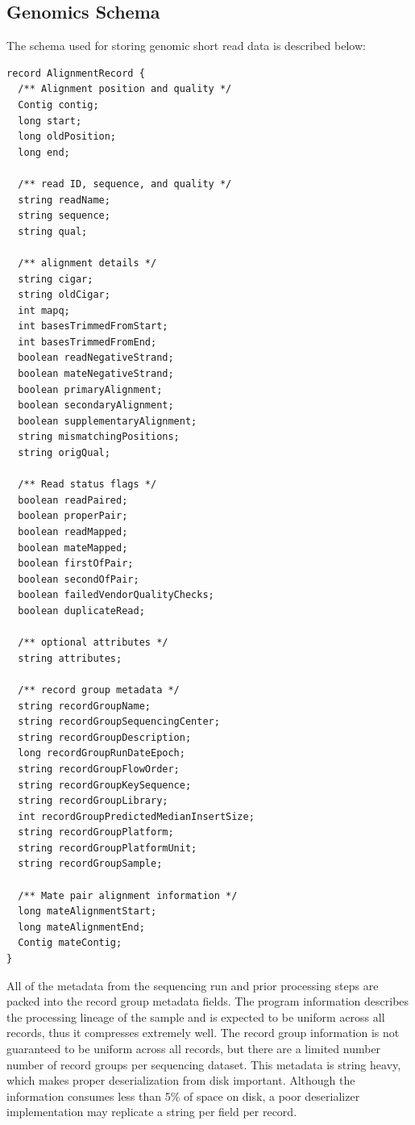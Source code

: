 \documentclass{sig-alternate}
\begin{document}
\subsection{Genomics Schema}
\label{sec:genomics-schema}

The schema used for storing genomic short read data is described below:

\begin{lstlisting}
record AlignmentRecord {
  /** Alignment position and quality */
  Contig contig;
  long start;
  long oldPosition;
  long end;

  /** read ID, sequence, and quality */
  string readName;
  string sequence;
  string qual;
  
  /** alignment details */
  string cigar;
  string oldCigar;
  int mapq;
  int basesTrimmedFromStart;
  int basesTrimmedFromEnd;
  boolean readNegativeStrand;
  boolean mateNegativeStrand;
  boolean primaryAlignment;
  boolean secondaryAlignment;
  boolean supplementaryAlignment;
  string mismatchingPositions;
  string origQual;

  /** Read status flags */
  boolean readPaired;
  boolean properPair;
  boolean readMapped;
  boolean mateMapped;
  boolean firstOfPair;
  boolean secondOfPair;
  boolean failedVendorQualityChecks;
  boolean duplicateRead;

  /** optional attributes */
  string attributes;

  /** record group metadata */
  string recordGroupName;
  string recordGroupSequencingCenter;
  string recordGroupDescription;
  long recordGroupRunDateEpoch;
  string recordGroupFlowOrder;
  string recordGroupKeySequence;
  string recordGroupLibrary;
  int recordGroupPredictedMedianInsertSize;
  string recordGroupPlatform;
  string recordGroupPlatformUnit;
  string recordGroupSample;

  /** Mate pair alignment information */
  long mateAlignmentStart;
  long mateAlignmentEnd;
  Contig mateContig;
}
\end{lstlisting}

All of the metadata from the sequencing run and prior processing steps are packed into the record
group metadata fields. The program information describes the processing lineage of the sample and
is expected to be uniform across all records, thus it compresses extremely well. The record group
information is not guaranteed to be uniform across all records, but there are a limited number number
of record groups per sequencing dataset. This
metadata is string heavy, which makes proper deserialization from disk important. Although the
information consumes less than 5\% of space on disk, a poor deserializer implementation may replicate
a string per field per record.
\end{document}
